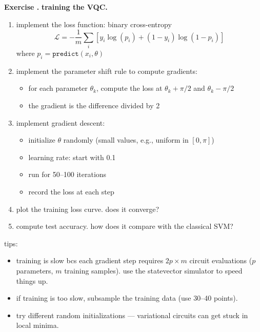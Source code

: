 \documentclass[11pt,a4paper]{article}
\theoremstyle{definition}
\theoremstyle{remark}
\newcounter{exercise}[section]
\newenvironment{exercise}{\refstepcounter{exercise}\par\medskip\noindent\textbf{Exercise \theexercise.}\rmfamily}{\medskip}
\begin{document}
\begin{exercise}
\textbf{training the VQC.}
\begin{enumerate}[leftmargin=*]
  \item implement the loss function: binary cross-entropy
    \[
    \mathcal{L} = -\frac{1}{m}\sum_i \left[y_i \log(p_i) + (1-y_i)\log(1-p_i)\right]
    \]
    where $p_i = \texttt{predict}(x_i, \theta)$
  \item implement the parameter shift rule to compute gradients:
    \begin{itemize}
      \item for each parameter $\theta_k$, compute the loss at $\theta_k + \pi/2$ and $\theta_k - \pi/2$
      \item the gradient is the difference divided by 2
    \end{itemize}
  \item implement gradient descent:
    \begin{itemize}
      \item initialize $\theta$ randomly (small values, e.g., uniform in $[0, \pi]$)
      \item learning rate: start with 0.1
      \item run for 50--100 iterations
      \item record the loss at each step
    \end{itemize}
  \item plot the training loss curve. does it converge?
  \item compute test accuracy. how does it compare with the classical SVM?
\end{enumerate}

tips:
\begin{itemize}[leftmargin=*]
  \item training is slow bcs each gradient step requires $2p \times m$ circuit evaluations ($p$ parameters, $m$ training samples). use the statevector simulator to speed things up.
  \item if training is too slow, subsample the training data (use 30--40 points).
  \item try different random initializations --- variational circuits can get stuck in local minima.
\end{itemize}
\end{exercise}
\end{document}
